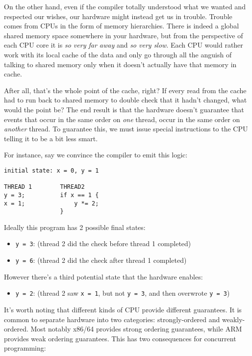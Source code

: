 \documentclass[a4paper,]{book}
\begin{document}
On the other hand, even if the compiler totally understood what we
wanted and respected our wishes, our hardware might instead get us in
trouble. Trouble comes from CPUs in the form of memory hierarchies.
There is indeed a global shared memory space somewhere in your hardware,
but from the perspective of each CPU core it is \emph{so very far away}
and \emph{so very slow}. Each CPU would rather work with its local cache
of the data and only go through all the anguish of talking to shared
memory only when it doesn't actually have that memory in cache.

After all, that's the whole point of the cache, right? If every read
from the cache had to run back to shared memory to double check that it
hadn't changed, what would the point be? The end result is that the
hardware doesn't guarantee that events that occur in the same order on
\emph{one} thread, occur in the same order on \emph{another} thread. To
guarantee this, we must issue special instructions to the CPU telling it
to be a bit less smart.

For instance, say we convince the compiler to emit this logic:

\begin{verbatim}
initial state: x = 0, y = 1

THREAD 1        THREAD2
y = 3;          if x == 1 {
x = 1;              y *= 2;
                }
\end{verbatim}

Ideally this program has 2 possible final states:

\begin{itemize}
\itemsep1pt\parskip0pt
\item
  \texttt{y\ =\ 3}: (thread 2 did the check before thread 1 completed)
\item
  \texttt{y\ =\ 6}: (thread 2 did the check after thread 1 completed)
\end{itemize}

However there's a third potential state that the hardware enables:

\begin{itemize}
\itemsep1pt\parskip0pt
\item
  \texttt{y\ =\ 2}: (thread 2 saw \texttt{x\ =\ 1}, but not
  \texttt{y\ =\ 3}, and then overwrote \texttt{y\ =\ 3})
\end{itemize}

It's worth noting that different kinds of CPU provide different
guarantees. It is common to separate hardware into two categories:
strongly-ordered and weakly- ordered. Most notably x86/64 provides
strong ordering guarantees, while ARM provides weak ordering guarantees.
This has two consequences for concurrent programming:
\end{document}
